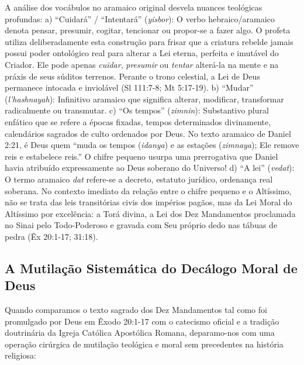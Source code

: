 \documentclass[11pt,a4paper,openany]{book}
\begin{document}
A análise dos vocábulos no aramaico original desvela nuances teológicas profundas:
a) ``Cuidará'' / ``Intentará'' (\textit{yisbor}): O verbo hebraico/aramaico denota pensar, presumir, cogitar, tencionar ou propor-se a fazer algo. O profeta utiliza deliberadamente esta construção para frisar que a criatura rebelde jamais possui poder ontológico real para alterar a Lei eterna, perfeita e imutável do Criador. Ele pode apenas \textit{cuidar}, \textit{presumir} ou \textit{tentar} alterá-la na mente e na práxis de seus súditos terrenos. Perante o trono celestial, a Lei de Deus permanece intocada e inviolável (Sl 111:7-8; Mt 5:17-19).
b) ``Mudar'' (\textit{l'hashnayah}): Infinitivo aramaico que significa alterar, modificar, transformar radicalmente ou transmutar.
c) ``Os tempos'' (\textit{zimnin}): Substantivo plural enfático que se refere a épocas fixadas, tempos determinados divinamente, calendários sagrados de culto ordenados por Deus. No texto aramaico de Daniel 2:21, é Deus quem ``muda os tempos (\textit{idanya}) e as estações (\textit{zimnaya}); Ele remove reis e estabelece reis.'' O chifre pequeno usurpa uma prerrogativa que Daniel havia atribuído expressamente ao Deus soberano do Universo!
d) ``A lei'' (\textit{vedat}): O termo aramaico \textit{dat} refere-se a decreto, estatuto jurídico, ordenança real soberana. No contexto imediato da relação entre o chifre pequeno e o Altíssimo, não se trata das leis transitórias civis dos impérios pagãos, mas da Lei Moral do Altíssimo por excelência: a Torá divina, a Lei dos Dez Mandamentos proclamada no Sinai pelo Todo-Poderoso e gravada com Seu próprio dedo nas tábuas de pedra (Êx 20:1-17; 31:18).



\subsection{A Mutilação Sistemática do Decálogo Moral de Deus}


Quando comparamos o texto sagrado dos Dez Mandamentos tal como foi promulgado por Deus em Êxodo 20:1-17 com o catecismo oficial e a tradição doutrinária da Igreja Católica Apostólica Romana, deparamo-nos com uma operação cirúrgica de mutilação teológica e moral sem precedentes na história religiosa:
\end{document}
